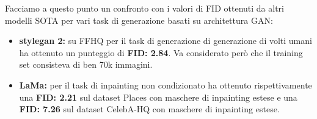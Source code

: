Facciamo a questo punto un confronto con i valori di FID ottenuti da altri modelli SOTA per vari task di generazione basati su architettura GAN:
\begin{itemize}
    \item \textbf{stylegan 2:} su FFHQ per il task di generazione di generazione di volti umani ha ottenuto un punteggio di \textbf{FID: 2.84}. Va considerato
        però che il training set consisteva di ben 70k immagini.
    \item \textbf{LaMa:} per il task di inpainting non condizionato ha ottenuto rispettivamente una \textbf{FID: 2.21} sul dataset Places con maschere di inpainting
    estese e una \textbf{FID: 7.26} sul dataset CelebA-HQ con maschere di inpainting estese.
\end{itemize}